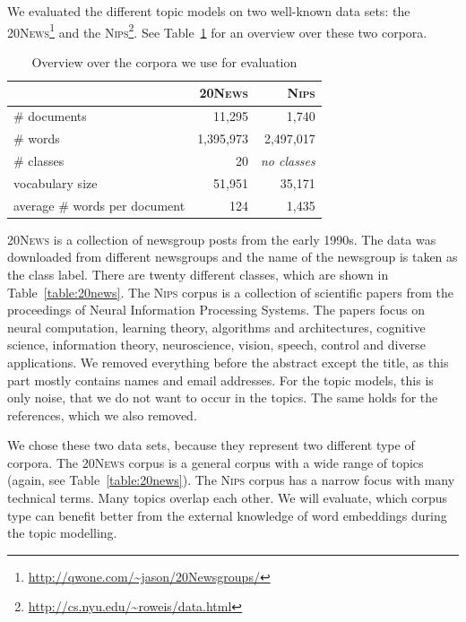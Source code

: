 \documentclass[
        a4paper,
        titlepage,
        twoside,
        parskip
        ]{scrbook}
\newcommand{\ra}[1]{\renewcommand{\arraystretch}{#1}}
\theoremstyle{break}
\begin{document}
We evaluated the different topic models on two well-known data sets: the \textsc{20News}\footnote{\url{http://qwone.com/~jason/20Newsgroups/}} and the \textsc{Nips}\footnote{\url{http://cs.nyu.edu/~roweis/data.html}}.
See Table~\ref{table:data_sets} for an overview over these two corpora.
\begin{table}[]
  \ra{1.3}
  \centering
  \caption{Overview over the corpora we use for evaluation}
  \label{table:data_sets}
  \begin{tabular}{@{}lrr@{}}
    \toprule
                               & \textsc{20News} & \textsc{Nips}                \\ \midrule
                               \# documents                  & 11,295            & 1,740               \\
                               \# words                      & 1,395,973         & 2,497,017           \\
                               \# classes                    & 20                & \textit{no classes} \\
                               vocabulary size               & 51,951            & 35,171              \\
                               average \# words per document & 124               & 1,435               \\
                               \bottomrule
  \end{tabular}
\end{table}
\textsc{20News} is a collection of newsgroup posts from the early 1990s.
The data was downloaded from different newsgroups and the name of the newsgroup is taken as the class label.
There are twenty different classes, which are shown in Table~\ref{table:20news}.
The \textsc{Nips} corpus is a collection of scientific papers from the proceedings of Neural Information Processing Systems.
The papers focus on neural computation, learning theory, algorithms and architectures, cognitive science, information theory, neuroscience, vision, speech, control and diverse applications.
We removed everything before the abstract except the title, as this part mostly contains names and email addresses.
For the topic models, this is only noise, that we do not want to occur in the topics.
The same holds for the references, which we also removed.

We chose these two data sets, because they represent two different type of corpora.
The \textsc{20News} corpus is a general corpus with a wide range of topics (again, see Table~\ref{table:20news}).
The \textsc{Nips} corpus has a narrow focus with many technical terms.
Many topics overlap each other.
We will evaluate, which corpus type can benefit better from the external knowledge of word embeddings during the topic modelling.
\end{document}
